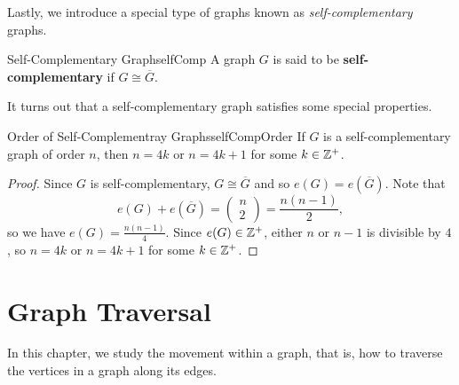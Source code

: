 \documentclass[math]{amznotes}
\theoremstyle{remark}
\begin{document}
Lastly, we introduce a special type of graphs known as \textit{self-complementary} graphs.
\begin{dfnbox}{Self-Complementary Graph}{selfComp}
    A graph $G$ is said to be {\color{red} \textbf{self-complementary}} if $G \cong \overline{G}$.
\end{dfnbox}
It turns out that a self-complementary graph satisfies some special properties.
\begin{probox}{Order of Self-Complementray Graphs}{selfCompOrder}
    If $G$ is a self-complementary graph of order $n$, then $n = 4k$ or $n = 4k + 1$ for some $k \in \mathbb{Z}^+$.
    \tcblower
    \begin{proof}
        Since $G$ is self-complementary, $G \cong \overline{G}$ and so $e(G) = e\left(\overline{G}\right)$. Note that
        \begin{equation*}
            e(G) + e\left(\overline{G}\right) = \begin{pmatrix}
                n \\
                2
            \end{pmatrix} = \frac{n(n - 1)}{2},
        \end{equation*}
        so we have $e(G) = \frac{n(n - 1)}{4}$. Since $e(G) \in \mathbb{Z}^+$, either $n$ or $n - 1$ is divisible by $4$, so $n = 4k$ or $n = 4k + 1$ for some $k \in \mathbb{Z}^+$.
    \end{proof}
\end{probox}
\chapter{Graph Traversal}
In this chapter, we study the movement within a graph, that is, how to traverse the vertices in a graph along its edges.
\end{document}
